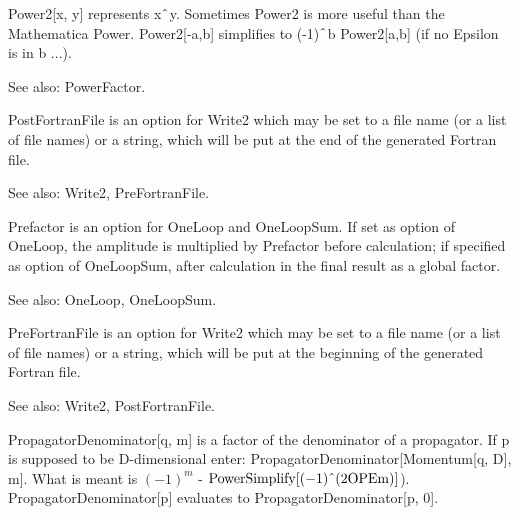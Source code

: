 




Power2[x, y] represents x\(\RawWedge\)y. { }Sometimes Power2 is more useful than the Mathematica Power. Power2[-a,b] simplifies to
  (-1)\(\RawWedge\)b Power2[a,b] (if no Epsilon is in b ...).

See also:  PowerFactor.








PostFortranFile is an option for Write2 which may be set to a file name (or a list of file names) or a string, { }which will be put at
  the end of the generated Fortran file.

See also:  Write2, PreFortranFile.



Prefactor is an option for OneLoop and OneLoopSum. If set as option of OneLoop, the amplitude is multiplied by Prefactor before
  calculation; if specified as option of OneLoopSum, after calculation in the final result as a global factor.

See also:  OneLoop, OneLoopSum.



PreFortranFile is an option for Write2 which may be set to a file name (or a list of file names) or a string, which will be put at the
  beginning of the generated Fortran file.

See also:  Write2, PostFortranFile.



PropagatorDenominator[q, m] is a factor of the denominator of a propagator. If p is supposed to be D-dimensional enter:
  PropagatorDenominator[Momentum[q, D], m]. What is meant is \({{(-1)}^m}\) - \(\Muserfunction{PowerSimplify}[(-1)\RawWedge (2\Mvariable{OPEm})]\)).
PropagatorDenominator[p] evaluates to PropagatorDenominator[p, 0]. 

